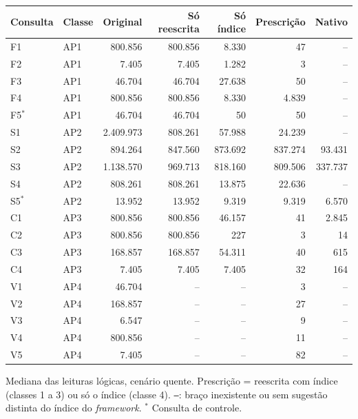 {\footnotesize\setlength{\tabcolsep}{3pt}
\begin{tabular}{llrrrrr}
\toprule
Consulta & Classe & Original & Só reescrita & Só índice & Prescrição & Nativo \\
\midrule
F1 & AP1 & 800.856 & 800.856 & 8.330 & 47 & -- \\
F2 & AP1 & 7.405 & 7.405 & 1.282 & 3 & -- \\
F3 & AP1 & 46.704 & 46.704 & 27.638 & 50 & -- \\
F4 & AP1 & 800.856 & 800.856 & 8.330 & 4.839 & -- \\
F5$^{*}$ & AP1 & 46.704 & 46.704 & 50 & 50 & -- \\
S1 & AP2 & 2.409.973 & 808.261 & 57.988 & 24.239 & -- \\
S2 & AP2 & 894.264 & 847.560 & 873.692 & 837.274 & 93.431 \\
S3 & AP2 & 1.138.570 & 969.713 & 818.160 & 809.506 & 337.737 \\
S4 & AP2 & 808.261 & 808.261 & 13.875 & 22.636 & -- \\
S5$^{*}$ & AP2 & 13.952 & 13.952 & 9.319 & 9.319 & 6.570 \\
C1 & AP3 & 800.856 & 800.856 & 46.157 & 41 & 2.845 \\
C2 & AP3 & 800.856 & 800.856 & 227 & 3 & 14 \\
C3 & AP3 & 168.857 & 168.857 & 54.311 & 40 & 615 \\
C4 & AP3 & 7.405 & 7.405 & 7.405 & 32 & 164 \\
V1 & AP4 & 46.704 & -- & -- & 3 & -- \\
V2 & AP4 & 168.857 & -- & -- & 27 & -- \\
V3 & AP4 & 6.547 & -- & -- & 9 & -- \\
V4 & AP4 & 800.856 & -- & -- & 11 & -- \\
V5 & AP4 & 7.405 & -- & -- & 82 & -- \\
\bottomrule
\end{tabular}\par
\vspace{3pt}
\begin{minipage}{\linewidth}\footnotesize
Mediana das leituras lógicas, cenário quente. Prescrição = reescrita com índice (classes 1 a 3) ou só o índice (classe 4). \texttt{--}: braço inexistente ou sem sugestão distinta do índice do \textit{framework}. $^{*}$ Consulta de controle.
\end{minipage}}
